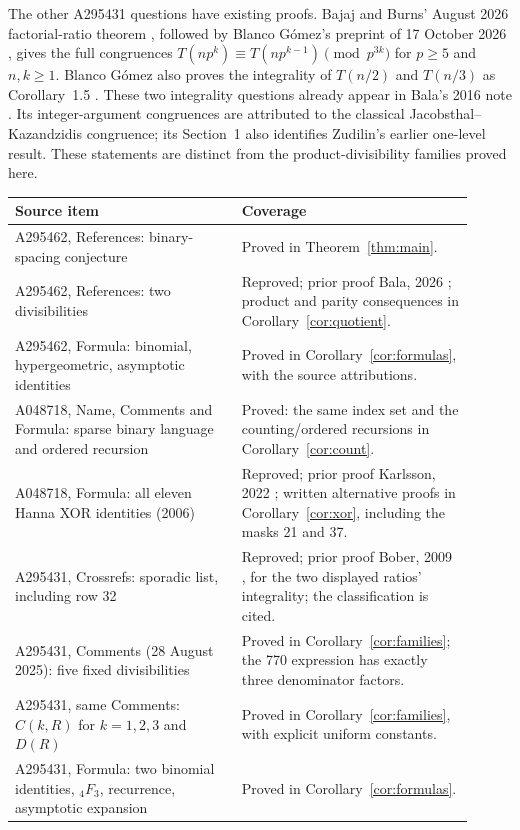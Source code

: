 \documentclass[11pt]{article}
\begin{document}
The other A295431 questions have existing proofs.
Bajaj and Burns' August 2026 factorial-ratio theorem
\cite[Section~1]{tower}, followed by Blanco G\'omez's preprint of
17 October 2026 \cite[Corollary~1.4(d)]{blanco}, gives the full congruences
$T(np^k)\equiv T(np^{k-1})\pmod{p^{3k}}$ for $p\geq5$ and
$n,k\geq1$. Blanco G\'omez also proves the integrality of
$T(n/2)$ and $T(n/3)$ as Corollary~1.5 \cite{blanco}.
These two integrality questions already appear in Bala's 2016 note
\cite[p.~5]{bala2016}.
Its integer-argument congruences are attributed to the classical
Jacobsthal--Kazandzidis congruence; its Section~1 also identifies
Zudilin's earlier one-level result. These statements are distinct from
the product-divisibility families proved here.

\begingroup\small
\begin{longtable}{p{0.45\linewidth}p{0.46\linewidth}}
\toprule
Source item&Coverage\\
\midrule
A295462, References: binary-spacing conjecture&Proved in Theorem~\ref{thm:main}.\\
A295462, References: two divisibilities&Reproved; prior proof Bala, 2026 \cite{bala}; product and parity consequences in Corollary~\ref{cor:quotient}.\\
A295462, Formula: binomial, hypergeometric, asymptotic identities&Proved in Corollary~\ref{cor:formulas}, with the source attributions.\\
A048718, Name, Comments and Formula: sparse binary language and ordered recursion&Proved: the same index set and the counting/ordered recursions in Corollary~\ref{cor:count}.\\
A048718, Formula: all eleven Hanna XOR identities (2006)&Reproved; prior proof Karlsson, 2022 \cite{walnut}; written alternative proofs in Corollary~\ref{cor:xor}, including the masks 21 and 37.\\
A295431, Crossrefs: sporadic list, including row 32&Reproved; prior proof Bober, 2009 \cite[Table~2]{bober}, for the two displayed ratios' integrality; the classification is cited.\\
A295431, Comments (28 August 2025): five fixed divisibilities&Proved in Corollary~\ref{cor:families}; the 770 expression has exactly three denominator factors.\\
A295431, same Comments: $C(k,R)$ for $k=1,2,3$ and $D(R)$&Proved in Corollary~\ref{cor:families}, with explicit uniform constants.\\
A295431, Formula: two binomial identities, ${}_4F_3$, recurrence, asymptotic expansion&Proved in Corollary~\ref{cor:formulas}.\\

\end{longtable}
\end{document}
